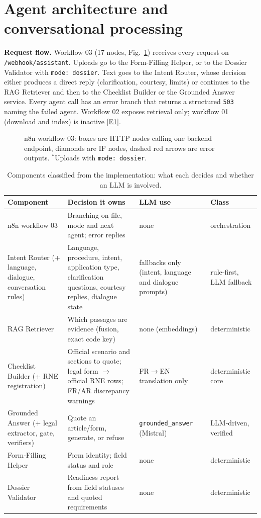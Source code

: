 \documentclass[10pt,a4paper]{article}
\newcommand{\code}[1]{\texttt{\small #1}}
\newcommand{\ev}[1]{\hyperref[app:evidence]{[#1]}}
\begin{document}
\section{Agent architecture and conversational processing}\label{sec:agents}
\textbf{Request flow.} Workflow 03 (17 nodes, Fig.~\ref{fig:agents}) receives every request on
\code{/webhook/assistant}. Uploads go to the Form-Filling Helper, or to the Dossier Validator with
\code{mode: dossier}. Text goes to the Intent Router, whose decision either produces a direct reply
(clarification, courtesy, limits) or continues to the RAG Retriever and then to the Checklist Builder or the
Grounded Answer service. Every agent call has an error branch that returns a structured \code{503} naming the
failed agent. Workflow 02 exposes retrieval only; workflow 01 (download and index) is inactive \ev{E1}.

\begin{figure}[!htb]
  \centering
  \resizebox{\textwidth}{!}{}
  \caption{n8n workflow 03: boxes are HTTP nodes calling one backend endpoint, diamonds are IF nodes, dashed
  red arrows are error outputs. $^\ast$Uploads with \code{mode: dossier}.}
  \label{fig:agents}
\end{figure}

\begin{table}[!htb]
  \centering\footnotesize
  \caption{Components classified from the implementation: what each decides and whether an LLM is involved.}\label{tab:classes}
  \begin{tabularx}{\textwidth}{@{}P{2.9cm} Y P{3.2cm} P{2.3cm}@{}}
  \toprule
  Component & Decision it owns & LLM use & Class \\
  \midrule
  n8n workflow 03 & Branching on file, mode and next agent; error replies & none & orchestration \\
  Intent Router (+ language, dialogue, conversation rules) & Language, procedure, intent, application type, clarification questions, courtesy replies, dialogue state & fallbacks only (intent, language and dialogue prompts) & rule-first, LLM fallback \\
  RAG Retriever & Which passages are evidence (fusion, exact code key) & none (embeddings) & deterministic \\
  Checklist Builder (+ RNE registration) & Official scenario and sections to quote; legal form $\rightarrow$ official RNE rows; FR/AR discrepancy warnings & FR$\rightarrow$EN translation only & deterministic core \\
  Grounded Answer (+ legal extractor, gate, verifiers) & Quote an article/form, generate, or refuse & \code{grounded\_answer} (Mistral) & LLM-driven, verified \\
  Form-Filling Helper & Form identity; field status and role & none & deterministic \\
  Dossier Validator & Readiness report from field statuses and quoted requirements & none & deterministic \\
  \bottomrule
  \end{tabularx}
\end{table}
\end{document}
